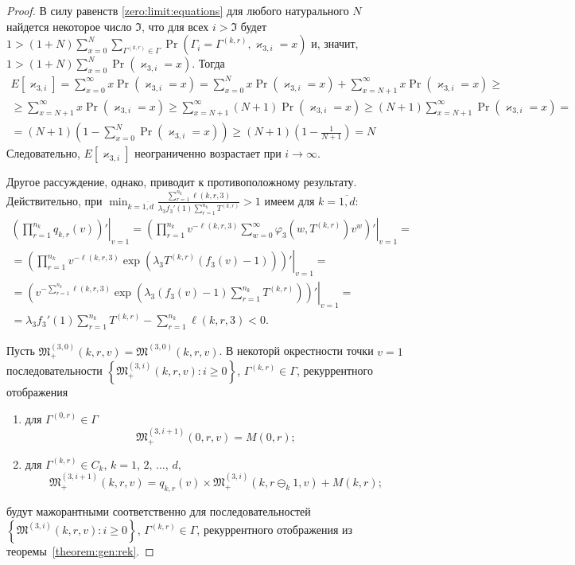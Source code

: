 \documentclass[a4paper,12pt,russian]{extarticle}
\begin{document}
\begin{proof}
В силу равенств \eqref{zero:limit:equations} для любого натурального $N$ найдется некоторое число $\mathfrak{I}$, что для всех $i > \mathfrak{I}$ будет
$1 > (1+N) \sum_{x=0}^{N} \sum_{\Gamma^{(k,r)}\in \Gamma}  \Pr(\Gamma_{i}=\Gamma^{(k,r)}, \varkappa_{3,i}=x)$ и, значит, $1 > (1+N) \sum_{x=0}^{N}  \Pr(\varkappa_{3,i}=x)$. Тогда
\begin{multline*}
E[\varkappa_{3,i}] = \sum_{x=0}^{\infty} x \Pr(\varkappa_{3,i}=x) = \sum_{x=0}^{N} x \Pr(\varkappa_{3,i}=x) + \sum_{x=N+1}^{\infty} x \Pr(\varkappa_{3,i}=x) \geqslant \\ \geqslant  \sum_{x=N+1}^{\infty} x \Pr(\varkappa_{3,i}=x) \geqslant \sum_{x=N+1}^{\infty} (N+1)
\Pr(\varkappa_{3,i}=x) \geqslant (N+1) \sum_{x=N+1}^{\infty} \Pr( \varkappa_{3,i}=x) =\\ =  (N+1) \left(1 - \sum_{x=0}^{N} \Pr(\varkappa_{3,i}=x)\right) \geqslant (N+1) \left(1 - \frac{1}{N+1}\right) = N
\end{multline*}
Следовательно, $E[\varkappa_{3,i}]$ неограниченно возрастает при $i \to \infty$. 

Другое рассуждение, однако, приводит к противоположному результату. Действительно, при $\min_{k=\overline{1,d}} { \frac{\sum_{r = 1}^{n_k} \ell(k,r,3) }{\lambda_3 f_3'(1) \sum_{r=1}^{n_k} T^{(k,r)} }}>1$ имеем для $k=\overline{1,d}$:
\begin{multline}
 \left.\left(\prod_{r=1}^{n_k}q_{k,r}(v)\right) ' \right|_{v=1} = 
  \left.\left(\prod_{r=1}^{n_k}v^{-\ell(k,r,3)}\sum_{w=0}^{\infty} \varphi_3(w,T^{(k,r)})v^w \right) ' \right|_{v=1} = \\ =
   \left.\left(\prod_{r=1}^{n_k} v^{-\ell(k,r,3)}\exp(\lambda_3 T^{(k,r)} (f_3(v)-1))\right) ' \right|_{v=1} = \\ =
    \left.\left(v^{-\sum_{r=1}^{n_k}\ell(k,r,3)}\exp(\lambda_3 (f_3(v)-1)\sum_{r=1}^{n_k} T^{(k,r)}) \right) ' \right|_{v=1} = \\ =
\lambda_3 f_3'(1) \sum_{r=1}^{n_k} T^{(k,r)} -\sum_{r=1}^{n_k} \ell(k,r,3)  < 0.
\label{derivative:cycle}
\end{multline}

Пусть $\mathfrak{M}_+^{(3,0)}(k,r,v) =\mathfrak{M}^{(3,0)}(k,r,v)$. В некоторй окрестности точки  $v = 1$  последовательности $\left\{\mathfrak{M}_+^{(3,i)}(k,r,v)\colon i \geqslant 0\right\}$, $\Gamma^{(k,r)} \in \Gamma$, рекуррентного отображения 
\begin{enumerate}
\item для $ \Gamma^{(0,r)} \in \Gamma$ $$\mathfrak{M}_+^{(3,i+1)}(0,r,v) = M(0,r);$$
\item для $\Gamma^{(k, r)} \in C_{k}$,  $k=1$, $2$, $\dots$, $d$,
$$\mathfrak{M}_+^{(3, i+1)}(k,r,v) = q_{k,r} (v)\times  \mathfrak{M}_+^{(3,i)}(k,r \ominus_{k} 1,v) + M(k,r);$$
\end{enumerate}
будут мажорантными соответственно для последовательностей $\left\{\mathfrak{M}^{(3,i)}(k,r,v)\colon i \geqslant 0\right\}$, $\Gamma^{(k,r)} \in \Gamma$, рекуррентного отображения из теоремы~\ref{theorem:gen:rek}.


\end{proof}
\end{document}
